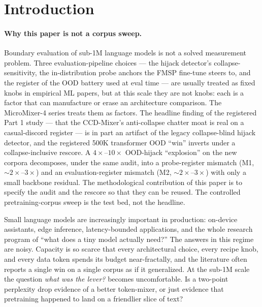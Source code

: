 \documentclass[11pt]{article}
\begin{document}
\begin{abstract}
The three fine-tuning seeds (42/43/44) ride on a single seed-42 backbone, so all backbone-level pretraining comparisons remain $n = 1$ except the discord-1M reference cell, which Part 1 now reports at three pretrain seeds (the discord-1M architecture gap replicates across backbone seeds; \S3.7). Chatter and the UC/ST non-EM metrics are single-seed (s42) and reported as trends, not statistics. The mixer's anti-collapse chatter advantage is register-dependent and does not transfer across training-distribution styles. The 500K$\to$300K memorization cliff and the EM=0 floor at $\leq 100$K replicate across all six architecture $\times$ corpus cells tested, and architecture-comparison claims are bounded to this two-architecture pair.
\end{abstract}

\section{Introduction}

\paragraph{Why this paper is not a corpus sweep.}
Boundary evaluation of sub-1M language models is not a solved measurement problem. Three evaluation-pipeline choices --- the hijack detector's collapse-sensitivity, the in-distribution probe anchors the FMSP fine-tune steers to, and the register of the OOD battery used at eval time --- are usually treated as fixed knobs in empirical ML papers, but at this scale they are not knobs: each is a factor that can manufacture or erase an architecture comparison. The MicroMixer-4 series treats them as factors. The headline finding of the registered Part 1 study --- that the CCD-Mixer's anti-collapse chatter moat is real on a casual-discord register --- is in part an artifact of the legacy collapse-blind hijack detector, and the registered 500K transformer OOD ``win'' inverts under a collapse-inclusive rescore. A $4\times$--$10\times$ OOD-hijack ``explosion'' on the new corpora decomposes, under the same audit, into a probe-register mismatch (M1, $\sim$$2\times$--$3\times$) and an evaluation-register mismatch (M2, $\sim$$2\times$--$3\times$) with only a small backbone residual. The methodological contribution of this paper is to specify the audit and the rescore so that they can be reused. The controlled pretraining-corpus sweep is the test bed, not the headline.

Small language models are increasingly important in production: on-device assistants, edge inference, latency-bounded applications, and the whole research program of ``what does a tiny model actually need?'' The answers in this regime are noisy. Capacity is so scarce that every architectural choice, every recipe knob, and every data token spends its budget near-fractally, and the literature often reports a single win on a single corpus as if it generalized. At the sub-1M scale the question \emph{what was the lever?} becomes uncomfortable. Is a two-point perplexity drop evidence of a better token-mixer, or just evidence that pretraining happened to land on a friendlier slice of text?
\end{document}
